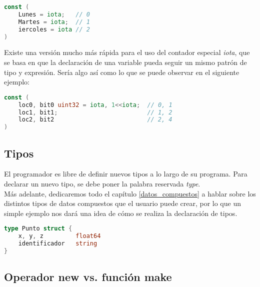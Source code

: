 \begin{minipage}{17.1cm}
\begin{lstlisting}[language=go,numbers=none,caption=Declaración de constantes
con iota, label=decliota]
const (
	Lunes = iota;	// 0
	Martes = iota;	// 1
	iercoles = iota // 2
)
\end{lstlisting}
\end{minipage}

		Existe una versión mucho más rápida para el uso del contador especial
		\emph{iota}, que se basa en que la declaración de una variable pueda
		seguir un mismo patrón de tipo y expresión. Sería algo así
		como lo que se puede observar en el siguiente ejemplo:

\begin{minipage}{17.1cm}
\begin{lstlisting}[language=go,numbers=none,caption=Declaración de constantes
con iota - forma corta, label=decliota2]
const (
	loc0, bit0 uint32 = iota, 1<<iota;	// 0, 1
	loc1, bit1;							// 1, 2
	loc2, bit2                          // 2, 4
)
\end{lstlisting}
\end{minipage}

	\subsection{Tipos}

	El programador es libre de definir nuevos tipos a lo largo de su programa.
	Para declarar un nuevo tipo, se debe poner la palabra reservada \emph{type}.\\

	Más adelante, dedicaremos todo el capítulo \ref{datos_compuestos} a hablar sobre los distintos
	tipos de datos compuestos que el usuario puede crear, por lo que un simple
	ejemplo nos dará una idea de cómo se realiza la declaración de tipos.

\begin{minipage}{17.1cm}
\begin{lstlisting}[language=go,numbers=none,caption=Declaración de nuevos
tipos,label=declnuevostipos]
type Punto struct {
	x, y, z			float64
	identificador 	string
}
\end{lstlisting}
\end{minipage}

	\subsection{Operador new vs. función make\label{newvsmake}}


